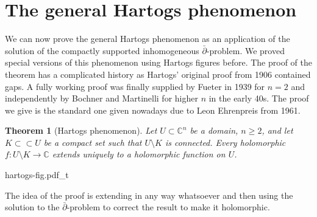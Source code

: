 \documentclass[12pt,openany]{book}
\newcommand{\C}{{\mathbb{C}}}
\theoremstyle{plain}
\newtheorem{thm}{Theorem}[section]
\theoremstyle{remark}
\theoremstyle{definition}
\newenvironment{myfig}{%
    \begin{center}
}{%
    \end{center}
}
\theoremstyle{exercise}
\theoremstyle{example}
\begin{document}

\section{The general Hartogs phenomenon}

We can now prove the general Hartogs phenomenon as an application of the
solution of the compactly supported
inhomogeneous $\bar{\partial}$-problem.  We proved special
versions of this phenomenon using Hartogs figures before.
The proof of the theorem has a complicated history as
Hartogs' original proof from 1906 contained gaps.
A fully working proof was finally supplied by Fueter in 1939 for $n=2$
and independently by Bochner and Martinelli for higher $n$
in the early 40s. 
The proof we give is the
standard one given nowadays due to Leon Ehrenpreis from 1961.

\begin{thm}[Hartogs phenomenon]
Let $U \subset \C^n$ be a domain, $n \geq 2$, and let
$K \subset \subset U$ be a compact set such that
$U \setminus K$ is connected.  Every holomorphic $f \colon U \setminus K \to \C$
extends uniquely to a holomorphic function on $U$.
\end{thm}

\begin{myfig}
{hartogs-fig.pdf_t}
\end{myfig}

The idea of the proof is extending in any way whatsoever and then using the solution
to the $\bar{\partial}$-problem to correct the result to make it
holomorphic.
\end{document}
